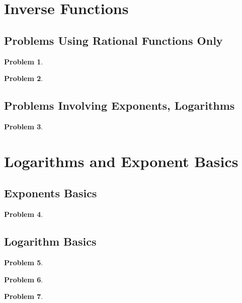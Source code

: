 \documentclass{article}
\newtheorem{problem}{Problem}
\begin{document}
\section{Inverse Functions}\label{secMPSInverseFunctions}

\subsection{Problems Using Rational Functions Only}
\begin{problem}

\end{problem}


\begin{problem}

\end{problem}

\subsection{Problems Involving Exponents, Logarithms}
\begin{problem}

\end{problem}





\section{Logarithms and Exponent Basics}\label{secMPSLogarithmsExponentsBasics}
\subsection{Exponents Basics}
\begin{problem}

\end{problem}


\subsection{Logarithm Basics}
\begin{problem}

\end{problem}

\begin{problem}

\end{problem}

\begin{problem}

\end{problem}

\end{document}
